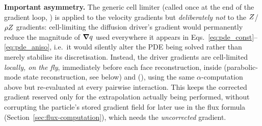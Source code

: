 \textbf{Important asymmetry.} The generic cell limiter
 (called once at the end of the
gradient loop, ) is applied to the
velocity gradients but \emph{deliberately not} to the $Z$/$\rho Z$
gradients: cell-limiting the
diffusion driver's gradient would permanently reduce the magnitude of
$\grad q$ used everywhere it appears in
Eqs.~\eqref{eq:pde_const}--\eqref{eq:pde_aniso}, i.e.\ it would silently
alter the PDE being solved rather than merely stabilise its
discretisation. Instead, the driver gradients are cell-limited
\emph{locally, on the fly}, immediately before each face reconstruction,
inside 
(parabolic-mode state reconstruction, see below) and
(), using the same
$\alpha$-computation above but re-evaluated at every pairwise
interaction. This keeps the corrected gradient reserved only for the
extrapolation actually being performed, without corrupting the
particle's stored gradient field for later use in the flux formula
(Section~\ref{sec:flux-computation}), which needs the \emph{uncorrected}
gradient.


